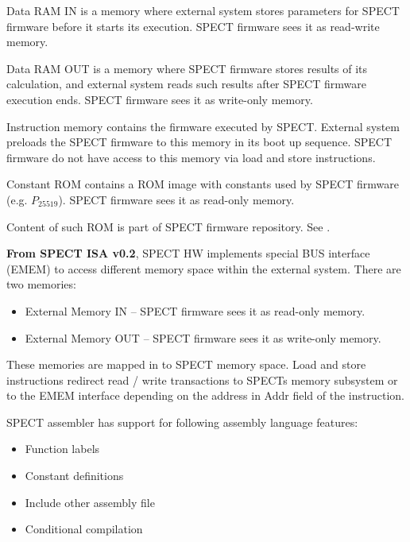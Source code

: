\documentclass[notconfidential]{tropic_design_spec}
\begin{document}



Data RAM IN is a memory where external system stores parameters for SPECT firmware
before it starts its execution. SPECT firmware sees it as read-write memory.


Data RAM OUT is a memory where SPECT firmware stores results of its calculation,
and external system reads such results after SPECT firmware execution ends. SPECT
firmware sees it as write-only memory.


Instruction memory contains the firmware executed by SPECT. External system preloads
the SPECT firmware to this memory in its boot up sequence.
SPECT firmware do not have access to this memory via load and store instructions.


Constant ROM contains a ROM image with constants used by SPECT firmware (e.g. $P_{25519}$).
SPECT firmware sees it as read-only memory.

Content of such ROM is part of SPECT firmware repository. See \cite{SPECTFW}.


\textbf{From SPECT ISA v0.2}, SPECT HW implements special BUS interface (EMEM) to access different memory space within the external system.
There are two memories:
\begin{itemize}
    \item External Memory IN -- SPECT firmware sees it as read-only memory.
    \item External Memory OUT -- SPECT firmware sees it as write-only memory.
\end{itemize}

These memories are mapped in to SPECT memory space. Load and store instructions redirect read / write transactions to
SPECTs memory subsystem or to the EMEM interface depending on the address in Addr field of the instruction.



SPECT assembler has support for following assembly language features:
\begin{itemize}
    \item{Function labels}
    \item{Constant definitions}
    \item{Include other assembly file}
    \item{Conditional compilation}
\end{itemize}
\end{document}

